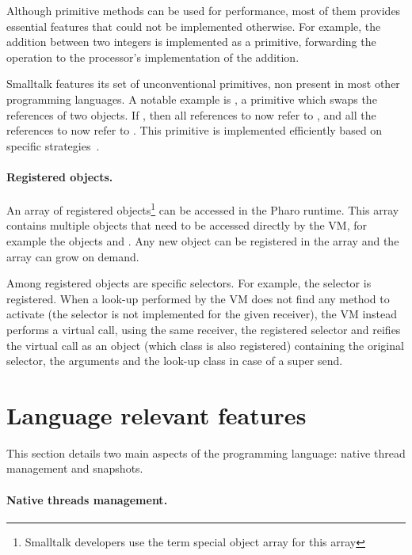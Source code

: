 \documentclass[a4paper,12pt,twoside]{../includes/ThesisStyle}
\begin{document}
Although primitive methods can be used for performance, most of them provides essential features that could not be implemented otherwise. For example, the addition between two integers is implemented as a primitive, forwarding the operation to the processor's implementation of the addition.

Smalltalk features its set of unconventional primitives, non present in most other programming languages. A notable example is , a primitive which swaps the references of two objects. If , then all references to  now refer to , and all the references to  now refer to . This primitive is implemented efficiently based on specific strategies~\cite{Mir15a}.

\paragraph{Registered objects.} An array of registered objects\footnote{Smalltalk developers use the term special object array for this array} can be accessed in the Pharo runtime. This array contains multiple objects that need to be accessed directly by the VM, for example the objects  and . Any new object can be registered in the array and the array can grow on demand.

Among registered objects are specific selectors. For example, the  selector is registered. When a look-up performed by the VM does not find any method to activate (the selector is not implemented for the given receiver), the VM instead performs a virtual call, using the same receiver, the registered  selector and reifies the virtual call as an object (which class is also registered) containing the original selector, the arguments and the look-up class in case of a super send. 


\section{Language relevant features}

This section details two main aspects of the programming language: native thread management and snapshots.

\paragraph{Native threads management.}
\end{document}
